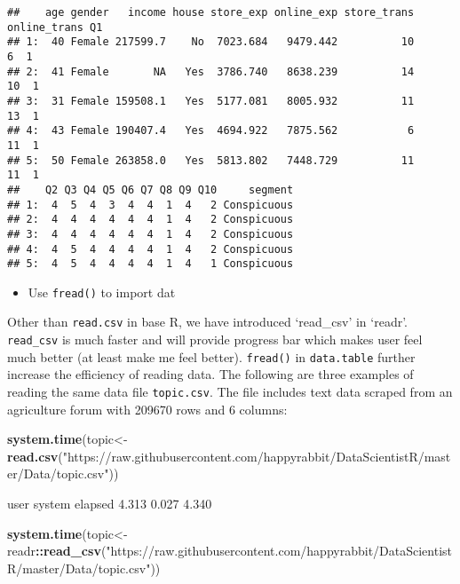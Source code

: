 \documentclass[
]{article}
\newenvironment{Shaded}{\begin{snugshade}}{\end{snugshade}}
\newcommand{\KeywordTok}[1]{\textcolor[rgb]{0.13,0.29,0.53}{\textbf{#1}}}
\newcommand{\NormalTok}[1]{#1}
\newcommand{\OperatorTok}[1]{\textcolor[rgb]{0.81,0.36,0.00}{\textbf{#1}}}
\newcommand{\StringTok}[1]{\textcolor[rgb]{0.31,0.60,0.02}{#1}}
\providecommand{\tightlist}{%
  \setlength{\itemsep}{0pt}\setlength{\parskip}{0pt}}
\begin{document}
\begin{verbatim}
##    age gender   income house store_exp online_exp store_trans online_trans Q1
## 1:  40 Female 217599.7    No  7023.684   9479.442          10            6  1
## 2:  41 Female       NA   Yes  3786.740   8638.239          14           10  1
## 3:  31 Female 159508.1   Yes  5177.081   8005.932          11           13  1
## 4:  43 Female 190407.4   Yes  4694.922   7875.562           6           11  1
## 5:  50 Female 263858.0   Yes  5813.802   7448.729          11           11  1
##    Q2 Q3 Q4 Q5 Q6 Q7 Q8 Q9 Q10     segment
## 1:  4  5  4  3  4  4  1  4   2 Conspicuous
## 2:  4  4  4  4  4  4  1  4   2 Conspicuous
## 3:  4  4  4  4  4  4  1  4   2 Conspicuous
## 4:  4  5  4  4  4  4  1  4   2 Conspicuous
## 5:  4  5  4  4  4  4  1  4   1 Conspicuous
\end{verbatim}

\begin{itemize}
\tightlist
\item
  Use \texttt{fread()} to import dat
\end{itemize}

Other than \texttt{read.csv} in base R, we have introduced `read\_csv'
in `readr'. \texttt{read\_csv} is much faster and will provide progress
bar which makes user feel much better (at least make me feel better).
\texttt{fread()} in \texttt{data.table} further increase the efficiency
of reading data. The following are three examples of reading the same
data file \texttt{topic.csv}. The file includes text data scraped from
an agriculture forum with 209670 rows and 6 columns:

\begin{Shaded}
\begin{Highlighting}[]
\KeywordTok{system.time}\NormalTok{(topic<-}\KeywordTok{read.csv}\NormalTok{(}\StringTok{"https://raw.githubusercontent.com/happyrabbit/DataScientistR/master/Data/topic.csv"}\NormalTok{))}
\end{Highlighting}
\end{Shaded}

\begin{Shaded}
\begin{Highlighting}[]
\NormalTok{  user  system elapsed }
\NormalTok{  4.313   0.027   4.340}
\end{Highlighting}
\end{Shaded}

\begin{Shaded}
\begin{Highlighting}[]
\KeywordTok{system.time}\NormalTok{(topic<-readr}\OperatorTok{::}\KeywordTok{read_csv}\NormalTok{(}\StringTok{"https://raw.githubusercontent.com/happyrabbit/DataScientistR/master/Data/topic.csv"}\NormalTok{))}
\end{Highlighting}
\end{Shaded}
\end{document}
